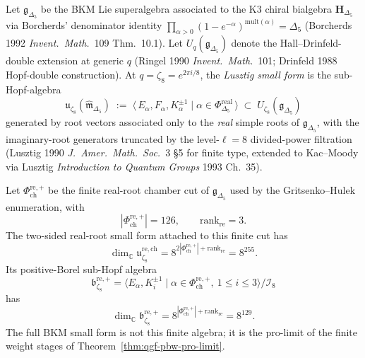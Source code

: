 \begin{definition}
\label{def:qgf-BKM-small-zeta8}
Let $\mathfrak g_{\Delta_5}$ be the BKM Lie superalgebra associated to
the K3 chiral bialgebra $\mathbf H_{\Delta_5}$ via Borcherds' denominator
identity $\prod_{\alpha>0}(1-e^{-\alpha})^{\mathrm{mult}(\alpha)} = \Delta_5$
(Borcherds 1992 \emph{Invent.~Math.}~109 Thm.~10.1). Let $U_q(\mathfrak
g_{\Delta_5})$ denote the Hall--Drinfeld-double extension at generic
$q$ (Ringel 1990 \emph{Invent.\ Math.}~101; Drinfeld 1988 Hopf-double
construction). At $q = \zeta_8 = e^{2\pi i/8}$, the
\emph{Lusztig small form} is the sub-Hopf-algebra
\[
 \mathfrak u_{\zeta_8}(\widehat{\mathfrak m}_{\Delta_5})
 \;:=\;
 \bigl\langle\, E_\alpha, F_\alpha, K_\alpha^{\pm 1}\mid
 \alpha\in\Phi^{\mathrm{real}}_{\Delta_5}\,\bigr\rangle
 \;\subset\; U_{\zeta_8}(\mathfrak g_{\Delta_5})
\]
generated by root vectors associated only to the \emph{real} simple
roots of $\mathfrak g_{\Delta_5}$, with the imaginary-root generators
truncated by the level-$\ell = 8$ divided-power filtration
(Lusztig 1990 \emph{J.~Amer.~Math.~Soc.}~3 \S5 for finite type,
extended to Kac--Moody via Lusztig \emph{Introduction to Quantum
Groups} 1993 Ch.~35).
\end{definition}

\begin{proposition}
\label{prop:qgf-small-BKM-finitedim}
Let \(\Phi^{\mathrm{re},+}_{\mathrm{ch}}\) be the finite real-root
chamber cut of \(\mathfrak g_{\Delta_5}\) used by the
Gritsenko--Hulek enumeration, with
\[
 |\Phi^{\mathrm{re},+}_{\mathrm{ch}}|=126,
 \qquad
 \mathrm{rank}_{\mathrm{re}}=3.
\]
The two-sided real-root small form attached to this finite cut has
\[
 \dim_{\mathbb C}\mathfrak u_{\zeta_8}^{\mathrm{re},\mathrm{ch}}
 =
 8^{2|\Phi^{\mathrm{re},+}_{\mathrm{ch}}|+\mathrm{rank}_{\mathrm{re}}}
 =
 8^{255}.
\]
Its positive-Borel sub-Hopf algebra
\[
 \mathfrak b^{\mathrm{re},+}_{\zeta_8}
 =
 \bigl\langle E_\alpha,K_i^{\pm1}\mid
 \alpha\in\Phi^{\mathrm{re},+}_{\mathrm{ch}},\ 1\leq i\leq3
 \bigr\rangle/\mathcal I_8
\]
has
\[
 \dim_{\mathbb C}\mathfrak b^{\mathrm{re},+}_{\zeta_8}
 =
 8^{|\Phi^{\mathrm{re},+}_{\mathrm{ch}}|+\mathrm{rank}_{\mathrm{re}}}
 =
 8^{129}.
\]
The full BKM small form is not this finite algebra; it is the pro-limit
of the finite weight stages of Theorem~\ref{thm:qgf-pbw-pro-limit}.
\end{proposition}

